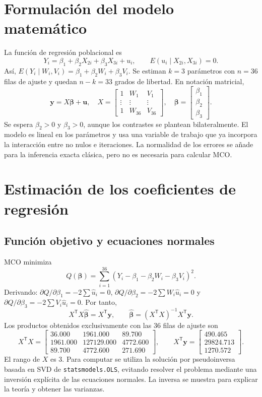 \documentclass[11pt,a4paper]{article}
\begin{document}
\section{Formulación del modelo matemático}
La función de regresión poblacional es
\begin{equation}
Y_i=\beta_1+\beta_2X_{2i}+\beta_3X_{3i}+u_i,
\qquad E(u_i\mid X_{2i},X_{3i})=0.
\end{equation}
Así, $E(Y_i\mid W_i,V_i)=\beta_1+\beta_2W_i+\beta_3V_i$. Se estiman $k=3$ parámetros con $n=36$ filas de ajuste y quedan $n-k=33$ grados de libertad. En notación matricial,
\[
\boldsymbol y=X\boldsymbol\beta+\boldsymbol u,\quad
X=\begin{bmatrix}1&W_1&V_1\\\vdots&\vdots&\vdots\\1&W_{36}&V_{36}\end{bmatrix},
\quad\boldsymbol\beta=\begin{bmatrix}\beta_1\\\beta_2\\\beta_3\end{bmatrix}.
\]
Se espera $\beta_2>0$ y $\beta_3>0$, aunque los contrastes se plantean bilateralmente. El modelo es lineal en los parámetros y usa una variable de trabajo que ya incorpora la interacción entre no nulos e iteraciones. La normalidad de los errores se añade para la inferencia exacta clásica, pero no es necesaria para calcular MCO.

\section{Estimación de los coeficientes de regresión}
\subsection{Función objetivo y ecuaciones normales}
MCO minimiza
\[
Q(\boldsymbol\beta)=\sum_{i=1}^{36}(Y_i-\beta_1-\beta_2W_i-\beta_3V_i)^2.
\]
Derivando: $\partial Q/\partial\beta_1=-2\sum\hat u_i=0$, $\partial Q/\partial\beta_2=-2\sum W_i\hat u_i=0$ y $\partial Q/\partial\beta_3=-2\sum V_i\hat u_i=0$. Por tanto,
\[
X^{\mathsf T}X\widehat{\boldsymbol\beta}=X^{\mathsf T}\boldsymbol y,
\qquad \widehat{\boldsymbol\beta}=(X^{\mathsf T}X)^{-1}X^{\mathsf T}\boldsymbol y.
\]
Los productos obtenidos exclusivamente con las 36 filas de ajuste son
\[
X^{\mathsf T}X=\begin{bmatrix}36.000 & 1961.000 & 89.700\\1961.000 & 127129.000 & 4772.600\\89.700 & 4772.600 & 271.690\end{bmatrix},\qquad
X^{\mathsf T}\boldsymbol y=\begin{bmatrix}490.465\\29824.713\\1270.572\end{bmatrix}.
\]
El rango de $X$ es 3. Para computar se utiliza la solución por pseudoinversa basada en SVD de \texttt{statsmodels.OLS}, evitando resolver el problema mediante una inversión explícita de las ecuaciones normales. La inversa se muestra para explicar la teoría y obtener las varianzas.
\end{document}
